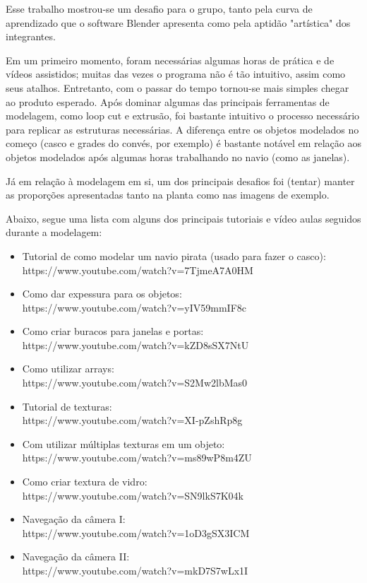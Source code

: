 Esse trabalho mostrou-se um desafio para o grupo, tanto pela curva de aprendizado que o software Blender apresenta como pela aptidão "artística" dos integrantes. 

Em um primeiro momento, foram necessárias algumas horas de prática e de vídeos assistidos; muitas das vezes o programa não é tão intuitivo, assim como seus atalhos. Entretanto, com o passar do tempo tornou-se mais simples chegar ao produto esperado. Após dominar algumas das principais ferramentas de modelagem, como loop cut e extrusão, foi bastante intuitivo o processo necessário para replicar as estruturas necessárias. A diferença entre os objetos modelados no começo (casco e grades do convés, por exemplo) é bastante notável em relação aos objetos modelados após algumas horas trabalhando no navio (como as janelas).

Já em relação à modelagem em si, um dos principais desafios foi (tentar) manter as proporções apresentadas tanto na planta como nas imagens de exemplo.

Abaixo, segue uma lista com alguns dos principais tutoriais e vídeo aulas seguidos durante a modelagem:

\begin{itemize}
    \item Tutorial de como modelar um navio pirata (usado para fazer o casco):\\ https://www.youtube.com/watch?v=7TjmeA7A0HM
    \item Como dar expessura para os objetos: \\https://www.youtube.com/watch?v=yIV59mmIF8c
    \item Como criar buracos para janelas e portas: \\https://www.youtube.com/watch?v=kZD8sSX7NtU
    \item Como utilizar arrays: \\https://www.youtube.com/watch?v=S2Mw2lbMas0
    \item Tutorial de texturas: \\https://www.youtube.com/watch?v=XI-pZshRp8g
    \item Com utilizar múltiplas texturas em um objeto: \\https://www.youtube.com/watch?v=ms89wP8m4ZU
    \item Como criar textura de vidro: \\https://www.youtube.com/watch?v=SN9lkS7K04k
    \item Navegação da câmera I: \\https://www.youtube.com/watch?v=1oD3gSX3ICM
    \item Navegação da câmera II: \\https://www.youtube.com/watch?v=mkD7S7wLx1I
\end{itemize}
